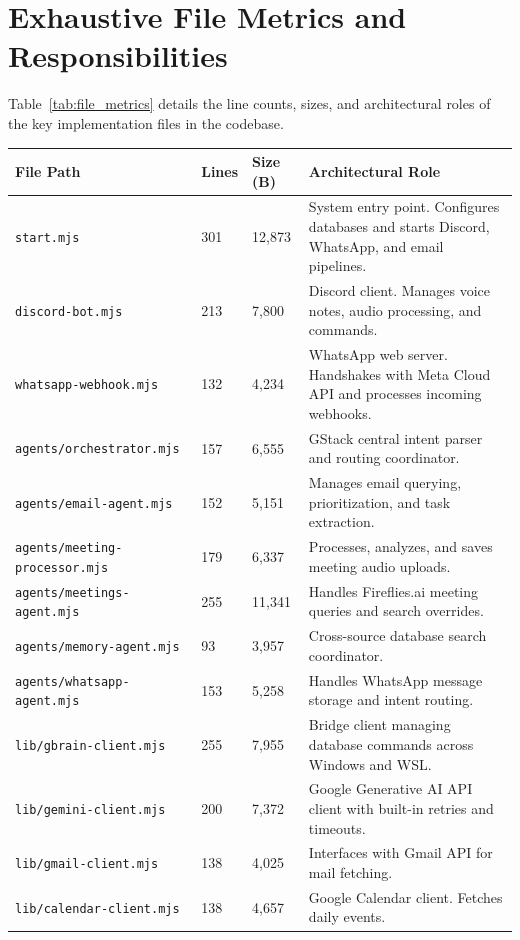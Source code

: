 \documentclass[12pt,a4paper]{report}
\begin{document}
\newpage
\section{Exhaustive File Metrics and Responsibilities}
Table~\ref{tab:file_metrics} details the line counts, sizes, and architectural roles of the key implementation files in the codebase.

\begin{table}[htbp]
\centering
\tiny
\begin{tabular}{L{4cm} C{1.2cm} C{1.2cm} L{8cm}}
\toprule
\textbf{File Path} & \textbf{Lines} & \textbf{Size (B)} & \textbf{Architectural Role} \\
\midrule
\texttt{start.mjs} & 301 & 12,873 & System entry point. Configures databases and starts Discord, WhatsApp, and email pipelines. \\
\texttt{discord-bot.mjs} & 213 & 7,800 & Discord client. Manages voice notes, audio processing, and commands. \\
\texttt{whatsapp-webhook.mjs} & 132 & 4,234 & WhatsApp web server. Handshakes with Meta Cloud API and processes incoming webhooks. \\
\texttt{agents/orchestrator.mjs} & 157 & 6,555 & GStack central intent parser and routing coordinator. \\
\texttt{agents/email-agent.mjs} & 152 & 5,151 & Manages email querying, prioritization, and task extraction. \\
\texttt{agents/meeting-processor.mjs} & 179 & 6,337 & Processes, analyzes, and saves meeting audio uploads. \\
\texttt{agents/meetings-agent.mjs} & 255 & 11,341 & Handles Fireflies.ai meeting queries and search overrides. \\
\texttt{agents/memory-agent.mjs} & 93 & 3,957 & Cross-source database search coordinator. \\
\texttt{agents/whatsapp-agent.mjs} & 153 & 5,258 & Handles WhatsApp message storage and intent routing. \\
\texttt{lib/gbrain-client.mjs} & 255 & 7,955 & Bridge client managing database commands across Windows and WSL. \\
\texttt{lib/gemini-client.mjs} & 200 & 7,372 & Google Generative AI API client with built-in retries and timeouts. \\
\texttt{lib/gmail-client.mjs} & 138 & 4,025 & Interfaces with Gmail API for mail fetching. \\
\texttt{lib/calendar-client.mjs} & 138 & 4,657 & Google Calendar client. Fetches daily events. \\

\end{tabular}
\end{table}
\end{document}
